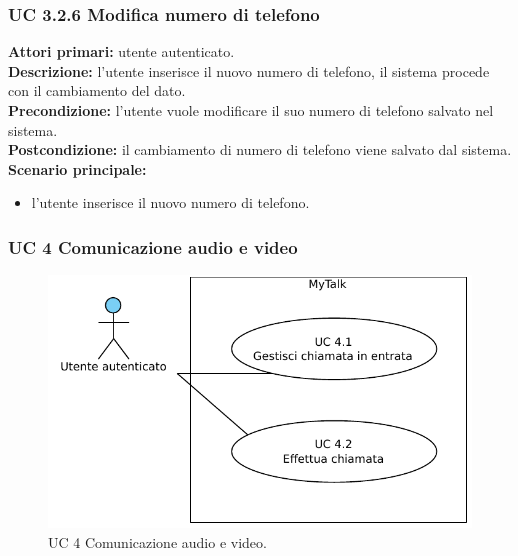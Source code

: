 \subsubsection{UC 3.2.6 Modifica numero di telefono}
\noindent
\textbf{Attori primari:} utente autenticato.\\
\textbf{Descrizione:} l'utente inserisce il nuovo numero di telefono, il sistema procede con il cambiamento del dato.\\
\textbf{Precondizione:} l'utente vuole modificare il suo numero di telefono salvato nel sistema.\\
\textbf{Postcondizione:} il cambiamento di numero di telefono viene salvato dal sistema.\\
\textbf{Scenario principale:}
\begin{itemize}
\item l'utente inserisce il nuovo numero di telefono.
\end{itemize}

\newpage

\subsubsection{UC 4 Comunicazione audio e video}

\begin{figure}[htbp]
\centering
\includegraphics[scale=0.7]{./casi_uso/UC4.pdf}
\caption{UC 4 Comunicazione audio e video.}
\end{figure}


